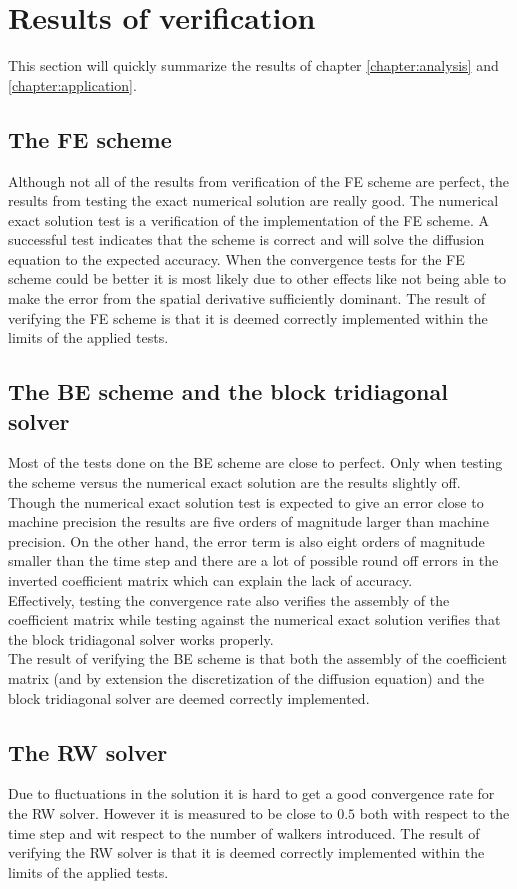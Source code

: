 \section{Results of verification}
This section will quickly summarize the results of chapter \ref{chapter:analysis} and \ref{chapter:application}.


\subsection{The FE scheme}
Although not all of the results from verification of the FE scheme are perfect, the results from testing the exact numerical solution are really good. 
The numerical exact solution test is a verification of the implementation of the FE scheme. 
A successful test indicates that the scheme is correct and will solve the diffusion equation to the expected accuracy. 
When the convergence tests for the FE scheme could be better it is most likely due to other effects like not being able to make the error from the spatial derivative sufficiently dominant. 
The result of verifying the FE scheme is that it is deemed correctly implemented within the limits of the applied tests.

\subsection{The BE scheme and the block tridiagonal solver}
Most of the tests done on the BE scheme are close to perfect. 
Only when testing the scheme versus the numerical exact solution are the results slightly off. 
Though the numerical exact solution test is expected to give an error close to machine precision the results are five orders of magnitude larger than machine precision. 
On the other hand, the error term is also eight orders of magnitude smaller than the time step and there are a lot of possible round off errors in the inverted coefficient matrix which can explain the lack of accuracy. \\
Effectively, testing the convergence rate also verifies the assembly of the coefficient matrix while testing against the numerical exact solution verifies that the block tridiagonal solver works properly.\\
The result of verifying the BE scheme is that both the assembly of the coefficient matrix (and by extension the discretization of the diffusion equation) and the block tridiagonal solver are deemed correctly implemented. 

\subsection{The RW solver}
Due to fluctuations in the solution it is hard to get a good convergence rate for the RW solver. 
However it is measured to be close to $0.5$ both with respect to the time step and wit respect to the number of walkers introduced. 
The result of verifying the RW solver is that it is deemed correctly implemented within the limits of the applied tests.

